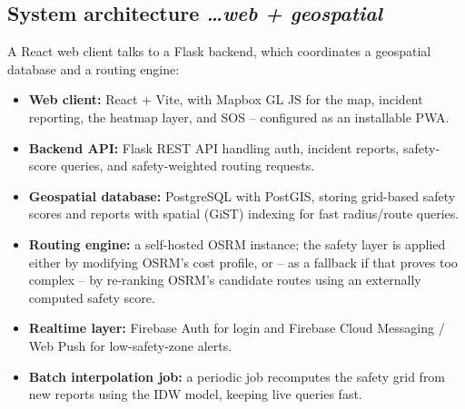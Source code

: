 \documentclass[11pt,a4paper]{article}
\newcommand{\BvrHint}[1]{%
  {\normalfont\normalsize\itshape\hfill #1}}
\begin{document}
\subsection{System architecture %
\BvrHint{\ldots web + geospatial}}
A React web client talks to a Flask backend, which coordinates a
geospatial database and a routing engine:
\begin{itemize}[leftmargin=0.7cm]
    \item \textbf{Web client:} React + Vite, with Mapbox GL JS for
    the map, incident reporting, the heatmap layer, and SOS --
    configured as an installable PWA.
    \item \textbf{Backend API:} Flask REST API handling auth,
    incident reports, safety-score queries, and safety-weighted
    routing requests.
    \item \textbf{Geospatial database:} PostgreSQL with PostGIS,
    storing grid-based safety scores and reports with spatial
    (GiST) indexing for fast radius/route queries.
    \item \textbf{Routing engine:} a self-hosted OSRM instance;
    the safety layer is applied either by modifying OSRM's cost
    profile, or -- as a fallback if that proves too complex --
    by re-ranking OSRM's candidate routes using an externally
    computed safety score.
    \item \textbf{Realtime layer:} Firebase Auth for login and
    Firebase Cloud Messaging / Web Push for low-safety-zone alerts.
    \item \textbf{Batch interpolation job:} a periodic job
    recomputes the safety grid from new reports using the IDW
    model, keeping live queries fast.
\end{itemize}
\end{document}
